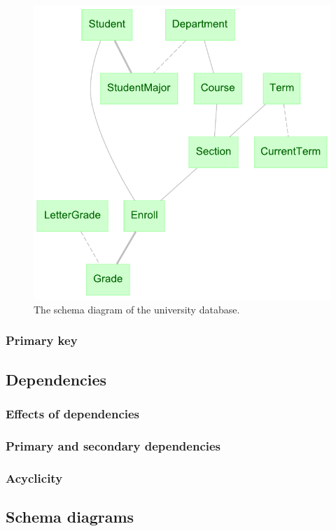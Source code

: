 \documentclass[letter,10pt]{article}
\begin{document}
\begin{figure}
\includegraphics[width=\columnwidth]{uni_erd.pdf}
\caption{The schema diagram of the university database.}
\label{fig:erd}
\end{figure}


\subsubsection{Primary key}

\subsection{Dependencies}
\subsubsection{Effects of dependencies}
\subsubsection{Primary and secondary dependencies}
\subsubsection{Acyclicity}

\subsection{Schema diagrams}\label{sec:diag}
\end{document}
